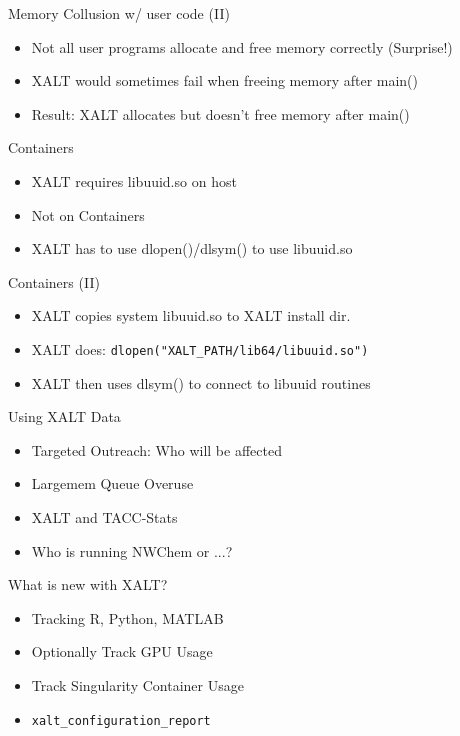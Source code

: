 \documentclass{beamer}
\begin{document}
\begin{frame}{Memory Collusion w/ user code (II)}
  \begin{itemize}
    \item Not all user programs allocate and free memory correctly (Surprise!)
    \item XALT would sometimes fail when freeing memory after main()
    \item Result: XALT allocates but doesn't free memory after main()
  \end{itemize}
\end{frame}

\begin{frame}{Containers}
  \begin{itemize}
    \item XALT requires libuuid.so on host
    \item Not on Containers
    \item XALT has to use dlopen()/dlsym() to use libuuid.so
  \end{itemize}
\end{frame}

\begin{frame}{Containers (II)}
  \begin{itemize}
    \item XALT copies system libuuid.so to XALT install dir.
    \item XALT does: \texttt{dlopen("XALT_PATH/lib64/libuuid.so")}
    \item XALT then uses dlsym() to connect to libuuid routines
  \end{itemize}
\end{frame}

\begin{frame}{Using XALT Data}
  \begin{itemize}
    \item Targeted Outreach: Who will be affected
    \item Largemem Queue Overuse
    \item XALT and TACC-Stats
    \item Who is running NWChem or ...?
  \end{itemize}
\end{frame}

\begin{frame}{What is new with XALT?}
  \begin{itemize}
    \item Tracking R, Python, MATLAB
    \item Optionally Track GPU Usage
    \item Track Singularity Container Usage
    \item \texttt{xalt\_configuration\_report}
  \end{itemize}
\end{frame}
\end{document}
